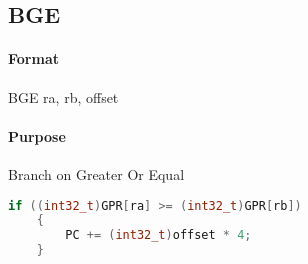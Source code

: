 \subsection{BGE}


\paragraph{Format} BGE ra, rb, offset

\paragraph{Purpose} Branch on Greater Or Equal

\begin{lstlisting}[language=c]
    if ((int32_t)GPR[ra] >= (int32_t)GPR[rb])
    {
        PC += (int32_t)offset * 4;
    }
\end{lstlisting}
